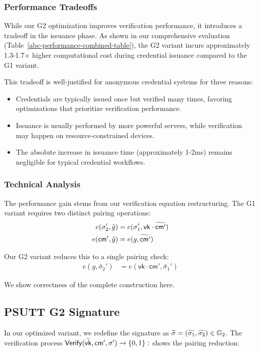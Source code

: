 \subsubsection{Performance Tradeoffs}
While our G2 optimization improves verification performance, it introduces a tradeoff in the issuance phase. As shown in our comprehensive evaluation (Table~\ref{abc-performance-combined-table}), the G2 variant incurs approximately 1.3-1.7× higher computational cost during credential issuance compared to the G1 variant.

This tradeoff is well-justified for anonymous credential systems for three reasons:
\begin{itemize}
    \item Credentials are typically issued once but verified many times, favoring optimizations that prioritize verification performance.
    \item Issuance is usually performed by more powerful servers, while verification may happen on resource-constrained devices.
    \item The absolute increase in issuance time (approximately 1-2ms) remains negligible for typical credential workflows.
\end{itemize}

\subsubsection{Technical Analysis}
The performance gain stems from our verification equation restructuring. The G1 variant requires two distinct pairing operations:
\begin{align}
e(\sigma_2', \tilde{g}) &= e(\sigma_1', \mathsf{vk} \cdot \widetilde{\mathsf{cm}'}) \\
e(\mathsf{cm}', \tilde{g}) &= e(g, \widetilde{\mathsf{cm}'})
\end{align}

Our G2 variant reduces this to a single pairing check:
\begin{align}
e(g, \widetilde{\sigma_2}') &= e(\mathsf{vk} \cdot \mathsf{cm}',\widetilde{\sigma_1}')
\end{align}

We show correctness of the complete construction here.

\subsection{PSUTT  G2 Signature}\label{rerandsig_g2}
In our optimized variant, we redefine the signature as $\widetilde{\sigma} = (\widetilde{\sigma_1}, \widetilde{\sigma_2}) \in \mathbb{G}_2$. The verification process $\mathsf{Verify}(\widetilde{\mathsf{vk}}, \mathsf{cm}', {\sigma}') \to \{0,1\}:$ shows the pairing reduction:

